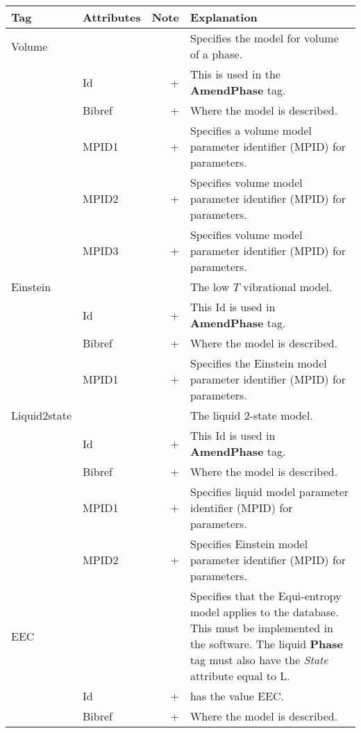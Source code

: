 \documentclass{article}
\begin{document}
\bigskip
\begin{tabular}{|p{} p{} r p{}|}\hline
  Tag & Attributes & Note & Explanation\\\hline

    Volume & && Specifies the model for volume of a phase.\\
      & Id & + & This is used in the {\bf AmendPhase} tag.\\
      & Bibref & + & Where the model is described.\\
      & MPID1 & + & Specifies a volume model parameter identifier
                    (MPID) for parameters.\\
      & MPID2 & + & Specifies volume model parameter identifier
                    (MPID) for parameters.\\
      & MPID3 & + & Specifies volume model parameter identifier
                    (MPID) for parameters.\\\hline

  Einstein & && The low $T$ vibrational model.\\
      & Id & + & This Id is used in {\bf AmendPhase} tag.\\
      & Bibref & + & Where the model is described.\\
      & MPID1 & + & Specifies the Einstein model parameter identifier (MPID) for parameters.\\\hline

  Liquid2state & && The liquid 2-state model.\\
      & Id & + & This Id is used in {\bf AmendPhase} tag.\\
      & Bibref & + & Where the model is described.\\
      & MPID1 & + & Specifies liquid model parameter identifier (MPID) for parameters.\\
      & MPID2 & + & Specifies Einstein model parameter identifier (MPID) for parameters.\\\hline

  EEC & && Specifies that the Equi-entropy model applies to the database.
                   This must be implemented in the software.  The liquid 
                   {\bf Phase} tag must also have the {\em State} attribute
                    equal to L. \\
      & Id     & + & has the value EEC.\\
      & Bibref & + & Where the model is described.\\\hline

\end{tabular}
\end{document}
